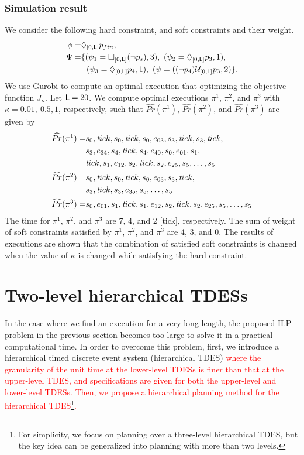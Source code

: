 \documentclass[journal,twoside,web]{IEEEtran}
\renewcommand{\Pr}{\widehat{Pr}}
\newcommand{\tick}{{\sf tick}}
\newcommand{\ttick}{{\textit tick}}
\newcommand{\Len}{{\sf L}}
\newcommand{\U}[1]{\mathcal{U}_{[#1]}}
\newcommand{\F}[1]{\Diamond_{[#1]}}
\newcommand{\G}[1]{\Box_{[#1]}}
\newcommand{\red}[1]{\textcolor{red}{#1}}
\begin{document}
\subsubsection{Simulation result}
%
We consider the following hard constraint, and soft constraints and their weight.
\begin{align}
\phi=&\F{0,\Len}p_{fin},\notag \\
\Psi 
=&\{
(\psi_1=\G{0,\Len}(\lnot p_s),3),~
(\psi_2=\F{0,\Len}p_3,1),\notag \\
&~~(\psi_3=\F{0,\Len}p_4,1),~
(\psi=((\lnot p_4) \U{0,\Len} p_3,2)
\}.\notag
\end{align}
%
We use Gurobi to compute an optimal execution that optimizing the objective function $J_\kappa$. 
Let $\Len=20$. We compute optimal executions $\pi^1$, $\pi^2$, and $\pi^3$ with $\kappa=0.01,~0.5,1$, respectively, such that $\Pr(\pi^1)$, $\Pr(\pi^2)$, and $\Pr(\pi^3)$ are given by
\begin{align}
\Pr(\pi^1)=&
s_0,\ttick,s_0,\ttick,s_0,e_{03},s_3,\ttick,s_3,\ttick,\notag\\
&s_3,e_{34},s_4,\ttick,s_4,e_{40},s_0,e_{01},s_1,\notag\\
&\ttick,s_1,e_{12},s_2,\ttick,s_2,e_{25},s_5,\ldots,s_5\notag\\
\Pr(\pi^2)=&
s_0,\ttick,s_0,\ttick,s_0,e_{03},s_3,\ttick,\notag\\
&s_3,\ttick,s_3,e_{35},s_5,\ldots,s_5\notag \\
\Pr(\pi^3)=&s_0,e_{01},s_1,\ttick,s_1,e_{12},s_2,\ttick,s_2,e_{25},s_5,\ldots,s_5\notag
\end{align}
%
The time for $\pi^1$, $\pi^2$, and $\pi^3$ are 7, 4, and 2 [\tick], respectively.
The sum of weight of soft constraints satisfied by $\pi^1$, $\pi^2$, and $\pi^3$ are 4, 3, and 0.
The results of executions are shown that the combination of satisfied soft constraints is changed when the value of $\kappa$ is changed while satisfying the hard constraint.
%
%
\section{Two-level hierarchical TDESs}\label{def:htdes}
%
%
In the case where we find an execution for a very long length, the proposed ILP problem in the previous section becomes too large to solve it in a practical computational time. 
In order to overcome this problem, first, we introduce a hierarchical timed discrete event system (hierarchical TDES) \red{where the granularity of the unit time at the lower-level TDESs is finer than that at the upper-level TDES, and specifications are given for both the upper-level and lower-level TDESs. Then, we propose a hierarchical planning method for the hierarchical TDES\footnote{For simplicity, we focus on planning over a three-level hierarchical TDES, but the key idea can be generalized into planning with more than two levels.}.}
\end{document}

